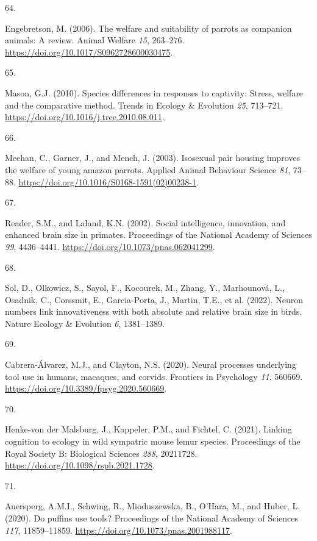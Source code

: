 \documentclass[
  man, donotrepeattitle,floatsintext]{apa6}
\newlength{\cslhangindent}
\newlength{\csllabelwidth}
\newlength{\cslentryspacingunit} %
\newenvironment{CSLReferences}[2] %
 {%
  \setlength{\parindent}{0pt}
  \ifodd #1
  \let\oldpar\par
  \def\par{\hangindent=\cslhangindent\oldpar}
  \fi
  \setlength{\parskip}{#2\cslentryspacingunit}
 }%
 {}
\newcommand{\CSLLeftMargin}[1]{\parbox[t]{\csllabelwidth}{#1}}
\newcommand{\CSLRightInline}[1]{\parbox[t]{\linewidth - \csllabelwidth}{#1}\break}
\begin{document}
\begin{CSLReferences}{0}{0}
\leavevmode{}%
\CSLLeftMargin{64. }%
\CSLRightInline{Engebretson, M. (2006). The welfare and suitability of parrots as companion animals: A review. Animal Welfare \emph{15}, 263--276. \url{https://doi.org/10.1017/S0962728600030475}.}

\leavevmode{}%
\CSLLeftMargin{65. }%
\CSLRightInline{Mason, G.J. (2010). Species differences in responses to captivity: Stress, welfare and the comparative method. Trends in Ecology \& Evolution \emph{25}, 713--721. \url{https://doi.org/10.1016/j.tree.2010.08.011}.}

\leavevmode{}%
\CSLLeftMargin{66. }%
\CSLRightInline{Meehan, C., Garner, J., and Mench, J. (2003). Isosexual pair housing improves the welfare of young amazon parrots. Applied Animal Behaviour Science \emph{81}, 73--88. \url{https://doi.org/10.1016/S0168-1591(02)00238-1}.}

\leavevmode{}%
\CSLLeftMargin{67. }%
\CSLRightInline{Reader, S.M., and Laland, K.N. (2002). Social intelligence, innovation, and enhanced brain size in primates. Proceedings of the National Academy of Sciences \emph{99}, 4436--4441. \url{https://doi.org/10.1073/pnas.062041299}.}

\leavevmode{}%
\CSLLeftMargin{68. }%
\CSLRightInline{Sol, D., Olkowicz, S., Sayol, F., Kocourek, M., Zhang, Y., Marhounová, L., Osadnik, C., Corssmit, E., Garcia-Porta, J., Martin, T.E., et al. (2022). Neuron numbers link innovativeness with both absolute and relative brain size in birds. Nature Ecology \& Evolution \emph{6}, 1381--1389.}

\leavevmode{}%
\CSLLeftMargin{69. }%
\CSLRightInline{Cabrera-Álvarez, M.J., and Clayton, N.S. (2020). Neural processes underlying tool use in humans, macaques, and corvids. Frontiers in Psychology \emph{11}, 560669. \url{https://doi.org/10.3389/fpsyg.2020.560669}.}

\leavevmode{}%
\CSLLeftMargin{70. }%
\CSLRightInline{Henke-von der Malsburg, J., Kappeler, P.M., and Fichtel, C. (2021). Linking cognition to ecology in wild sympatric mouse lemur species. Proceedings of the Royal Society B: Biological Sciences \emph{288}, 20211728. \url{https://doi.org/10.1098/rspb.2021.1728}.}

\leavevmode{}%
\CSLLeftMargin{71. }%
\CSLRightInline{Auersperg, A.M.I., Schwing, R., Mioduszewska, B., O'Hara, M., and Huber, L. (2020). Do puffins use tools? Proceedings of the National Academy of Sciences \emph{117}, 11859--11859. \url{https://doi.org/10.1073/pnas.2001988117}.}


\end{CSLReferences}
\end{document}
